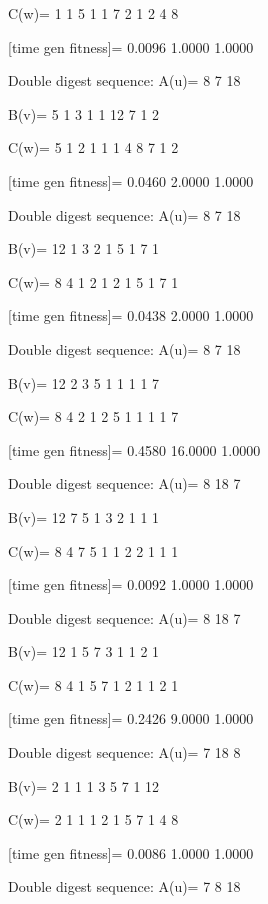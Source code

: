 C(w)=
     1     1     5     1     1     7     2     1     2     4     8

[time gen fitness]=
    0.0096    1.0000    1.0000

Double digest sequence:
A(u)=
     8     7    18

B(v)=
     5     1     3     1     1    12     7     1     2

C(w)=
     5     1     2     1     1     1     4     8     7     1     2

[time gen fitness]=
    0.0460    2.0000    1.0000

Double digest sequence:
A(u)=
     8     7    18

B(v)=
    12     1     3     2     1     5     1     7     1

C(w)=
     8     4     1     2     1     2     1     5     1     7     1

[time gen fitness]=
    0.0438    2.0000    1.0000

Double digest sequence:
A(u)=
     8     7    18

B(v)=
    12     2     3     5     1     1     1     1     7

C(w)=
     8     4     2     1     2     5     1     1     1     1     7

[time gen fitness]=
    0.4580   16.0000    1.0000

Double digest sequence:
A(u)=
     8    18     7

B(v)=
    12     7     5     1     3     2     1     1     1

C(w)=
     8     4     7     5     1     1     2     2     1     1     1

[time gen fitness]=
    0.0092    1.0000    1.0000

Double digest sequence:
A(u)=
     8    18     7

B(v)=
    12     1     5     7     3     1     1     2     1

C(w)=
     8     4     1     5     7     1     2     1     1     2     1

[time gen fitness]=
    0.2426    9.0000    1.0000

Double digest sequence:
A(u)=
     7    18     8

B(v)=
     2     1     1     1     3     5     7     1    12

C(w)=
     2     1     1     1     2     1     5     7     1     4     8

[time gen fitness]=
    0.0086    1.0000    1.0000

Double digest sequence:
A(u)=
     7     8    18

